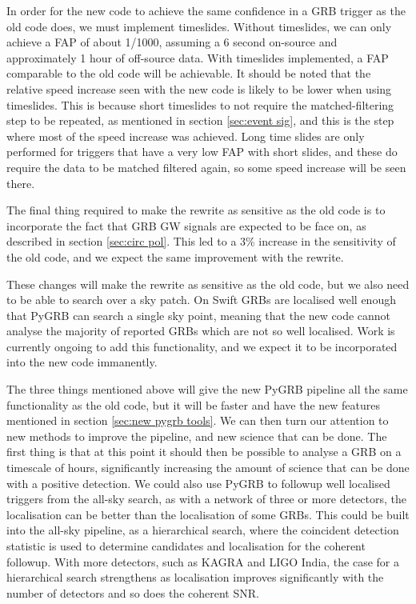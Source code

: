 \documentclass[11pt]{cuthesis}
\begin{document}
In order for the new code to achieve the same confidence in a GRB trigger as the old code does, we must implement timeslides. Without timeslides, we can only achieve a FAP of about 1/1000, assuming a 6 second on-source and approximately 1 hour of off-source data. With timeslides implemented, a FAP comparable to the old code will be achievable. It should be noted that the relative speed increase seen with the new code is likely to be lower when using timeslides. This is because short timeslides to not require the matched-filtering step to be repeated, as mentioned in section \ref{sec:event sig}, and this is the step where most of the speed increase was achieved. Long time slides are only performed for triggers that have a very low FAP with short slides, and these do require the data to be matched filtered again, so some speed increase will be seen there.

The final thing required to make the rewrite as sensitive as the old code is to incorporate the fact that GRB GW signals are expected to be face on, as described in section \ref{sec:circ pol}. This led to a 3\% increase in the sensitivity of the old code, and we expect the same improvement with the rewrite. 

These changes will make the rewrite as sensitive as the old code, but we also need to be able to search over a sky patch. On Swift GRBs are localised well enough that PyGRB can search a single sky point, meaning that the new code cannot analyse the majority of reported GRBs which are not so well localised. Work is currently ongoing to add this functionality, and we expect it to be incorporated into the new code immanently. 

The three things mentioned above will give the new PyGRB pipeline all the same functionality as the old code, but it will be faster and have the new features mentioned in section \ref{sec:new pygrb tools}. We can then turn our attention to new methods to improve the pipeline, and new science that can be done. The first thing is that at this point it should then be possible to analyse a GRB on a timescale of hours, significantly increasing the amount of science that can be done with a positive detection. We could also use PyGRB to followup well localised triggers from the all-sky search, as with a network of three or more detectors, the localisation can be better than the localisation of some GRBs. This could be built into the all-sky pipeline, as a hierarchical search, where the coincident detection statistic is used to determine candidates and localisation for the coherent followup. With more detectors, such as KAGRA and LIGO India, the case for a hierarchical search strengthens as localisation improves significantly with the number of detectors and so does the coherent SNR.
\end{document}
